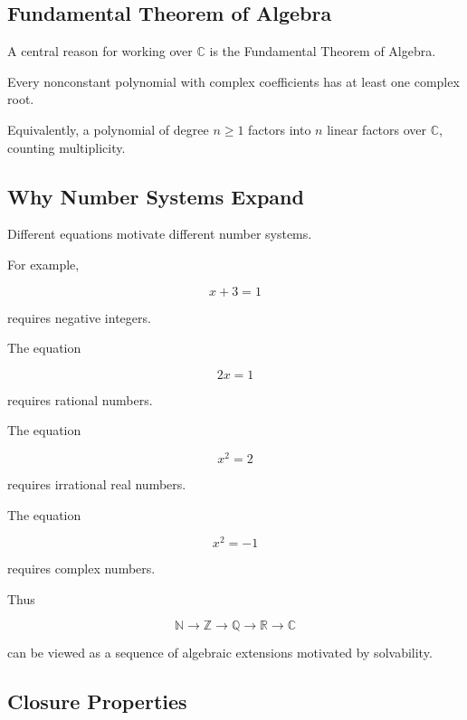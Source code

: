 \subsection{Fundamental Theorem of Algebra}
\label{subsec:fundamental-theorem-algebra-reference}

A central reason for working over \(\mathbb{C}\) is the Fundamental Theorem
of Algebra.

\begin{importantbox}
Every nonconstant polynomial with complex coefficients has at least one
complex root.
\end{importantbox}

Equivalently, a polynomial of degree \(n\geq1\) factors into \(n\) linear
factors over \(\mathbb{C}\), counting multiplicity.

\subsection{Why Number Systems Expand}
\label{subsec:why-number-systems-expand}

Different equations motivate different number systems.

For example,

\[
\boxed{
x+3=1
}
\]

requires negative integers.

The equation

\[
\boxed{
2x=1
}
\]

requires rational numbers.

The equation

\[
\boxed{
x^2=2
}
\]

requires irrational real numbers.

The equation

\[
\boxed{
x^2=-1
}
\]

requires complex numbers.

Thus

\[
\boxed{
\mathbb{N}
\rightarrow
\mathbb{Z}
\rightarrow
\mathbb{Q}
\rightarrow
\mathbb{R}
\rightarrow
\mathbb{C}
}
\]

can be viewed as a sequence of algebraic extensions motivated by solvability.

\subsection{Closure Properties}
\label{subsec:number-system-closure}

